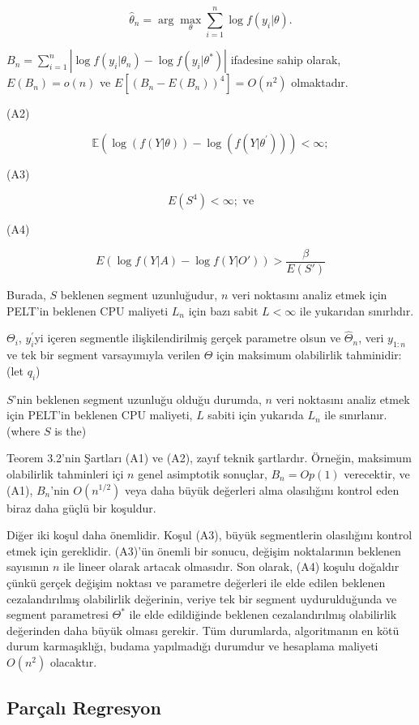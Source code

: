 \documentclass[12pt,twoside]{deuthesis}
\begin{document}
\[ \hat{\theta}_n = \arg\max_{\theta} \sum_{i=1}^n \log f(y_i|\theta). \]

\(B_n = \sum_{i=1}^n \left| \log f(y_i|\theta_n) - \log f(y_i|\theta^*) \right|\) ifadesine sahip olarak, \(E(B_n) = o(n)\) ve \(E[(B_n - E(B_n))^4] = O(n^2)\) olmaktadır.

(A2)

\[ \mathbb{E} \left( \log(f(Y|\theta)) - \log(f(Y|\theta^{'})) \right) < \infty; \]

(A3)

\[ E(S^4) < \infty; \text{ ve} \]

(A4)

\[ E\left(\log f(Y|A) - \log f(Y|O')\right) > \frac{\beta}{E(S')} \]

Burada, \(S\) beklenen segment uzunluğudur, \(n\) veri noktasını analiz etmek için PELT'in beklenen CPU maliyeti \(L_n\) için bazı sabit \(L < \infty\) ile yukarıdan sınırlıdır.

\(\Theta_i\), \(y_i^{'}\)yi içeren segmentle ilişkilendirilmiş gerçek parametre olsun ve \(\hat{\Theta}_n\), veri \(y_{1:n}\) ve tek bir segment varsayımıyla verilen \(\Theta\) için maksimum olabilirlik tahminidir: (let \(q_i\))

\(S\)'nin beklenen segment uzunluğu olduğu durumda, \(n\) veri noktasını analiz etmek için PELT'in beklenen CPU maliyeti, \(L\) sabiti için yukarıda \(L_n\) ile sınırlanır. (where \(S\) is the)

Teorem 3.2'nin Şartları (A1) ve (A2), zayıf teknik şartlardır. Örneğin, maksimum olabilirlik tahminleri içi \(n\) genel asimptotik sonuçlar, \(B_n = Op(1)\) verecektir, ve (A1), \(B_n\)'nin \(O(n^{1/2})\) veya daha büyük değerleri alma olasılığını kontrol eden biraz daha güçlü bir koşuldur.

Diğer iki koşul daha önemlidir. Koşul (A3), büyük segmentlerin olasılığını kontrol etmek için gereklidir. (A3)'ün önemli bir sonucu, değişim noktalarının beklenen sayısının \(n\) ile lineer olarak artacak olmasıdır. Son olarak, (A4) koşulu doğaldır çünkü gerçek değişim noktası ve parametre değerleri ile elde edilen beklenen cezalandırılmış olabilirlik değerinin, veriye tek bir segment uydurulduğunda ve segment parametresi \(\Theta^*\) ile elde edildiğinde beklenen cezalandırılmış olabilirlik değerinden daha büyük olması gerekir. Tüm durumlarda, algoritmanın en kötü durum karmaşıklığı, budama yapılmadığı durumdur ve hesaplama maliyeti \(O(n^2)\) olacaktır.

\hypertarget{paruxe7alux131-regresyon}{%
\subsection{Parçalı Regresyon}\label{paruxe7alux131-regresyon}}
\end{document}
